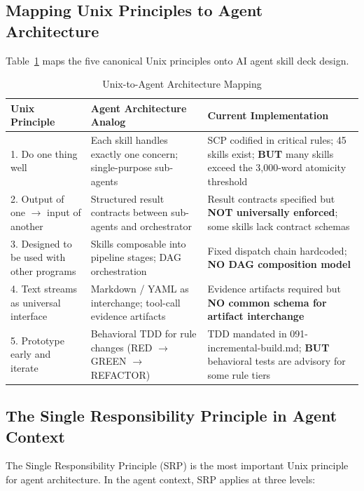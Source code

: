 \documentclass[11pt,a4paper]{article}
\begin{document}
\subsection{Mapping Unix Principles to Agent Architecture}

Table~\ref{tab:unix} maps the five canonical Unix principles onto AI agent skill deck design.

\begin{table}[htbp]
\centering
\caption{Unix-to-Agent Architecture Mapping}
\label{tab:unix}
\small
\begin{tabular}{@{}p{3.5cm}p{5cm}p{5cm}@{}}
\toprule
\textbf{Unix Principle}       & \textbf{Agent Architecture Analog}          & \textbf{Current Implementation} \\
\midrule
1. Do one thing well
  & Each skill handles exactly one concern; single-purpose sub-agents
  & SCP codified in critical rules; 45 skills exist; \textbf{BUT} many skills exceed the 3,000-word atomicity threshold \\
\midrule
2. Output of one $\to$ input of another
  & Structured result contracts between sub-agents and orchestrator
  & Result contracts specified but \textbf{NOT universally enforced}; some skills lack contract schemas \\
\midrule
3. Designed to be used with other programs
  & Skills composable into pipeline stages; DAG orchestration
  & Fixed dispatch chain hardcoded; \textbf{NO DAG composition model} \\
\midrule
4. Text streams as universal interface
  & Markdown / YAML as interchange; tool-call evidence artifacts
  & Evidence artifacts required but \textbf{NO common schema for artifact interchange} \\
\midrule
5. Prototype early and iterate
  & Behavioral TDD for rule changes (RED $\to$ GREEN $\to$ REFACTOR)
  & TDD mandated in 091-incremental-build.md; \textbf{BUT} behavioral tests are advisory for some rule tiers \\
\bottomrule
\end{tabular}
\end{table}

\subsection{The Single Responsibility Principle in Agent Context}

The Single Responsibility Principle (SRP) is the most important Unix principle for agent architecture.  In the agent context, SRP applies at three levels:
\end{document}
